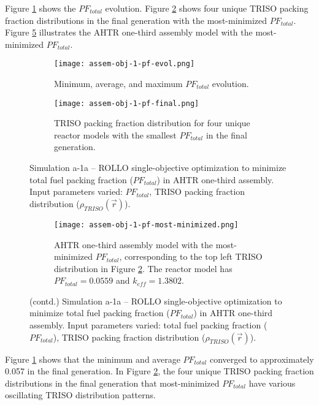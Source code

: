 Figure \ref{fig:assem-obj-1-pf-evol} shows the $PF_{total}$ evolution.
Figure \ref{fig:assem-obj-1-pf-final} shows four unique TRISO packing fraction 
distributions in the final generation with the most-minimized $PF_{total}$. 
Figure \ref{fig:assem-obj-1-pf-most-minimized} illustrates the \gls{AHTR} one-third 
assembly model with the most-minimized $PF_{total}$.
\begin{figure}[htbp!]
    \begin{subfigure}{\textwidth}
        \centering
        \texttt{[image: assem-obj-1-pf-evol.png]}
        \caption{Minimum, average, and maximum $PF_{total}$ evolution.}
        \label{fig:assem-obj-1-pf-evol} 
    \end{subfigure}
    \begin{subfigure}{\textwidth}
        \centering
        \texttt{[image: assem-obj-1-pf-final.png]}
        \caption{TRISO packing fraction distribution for four unique reactor models with the 
        smallest $PF_{total}$ in the final generation.}
        \label{fig:assem-obj-1-pf-final} 
    \end{subfigure}
    \caption{Simulation a-1a -- ROLLO single-objective optimization to minimize total 
    fuel packing fraction ($PF_{total}$) in \gls{AHTR} one-third assembly. 
    Input parameters varied: $PF_{total}$, \gls{TRISO} packing fraction 
    distribution ($\rho_{TRISO}(\vec{r})$).}
    \label{fig:assem-obj-1-pf}
\end{figure}
\begin{figure}[htbp!]
    \ContinuedFloat
    \begin{subfigure}{\textwidth}
        \centering
        \texttt{[image: assem-obj-1-pf-most-minimized.png]}
        \caption{\gls{AHTR} one-third assembly model with the most-minimized 
        $PF_{total}$, corresponding to the top left TRISO distribution in Figure 
        \ref{fig:assem-obj-1-pf-final}. The reactor model has $PF_{total}=0.0559$
        and $k_{eff}=1.3802$.}
        \label{fig:assem-obj-1-pf-most-minimized} 
    \end{subfigure}
    \caption{(contd.) Simulation a-1a -- ROLLO single-objective optimization to minimize total 
    fuel packing fraction ($PF_{total}$) in \gls{AHTR} one-third assembly. 
    Input parameters varied: total fuel packing fraction 
    ($PF_{total}$), \gls{TRISO} packing fraction distribution ($\rho_{TRISO}(\vec{r})$).}
\end{figure}
Figure \ref{fig:assem-obj-1-pf-evol} shows that the minimum and average $PF_{total}$ 
converged to approximately 0.057 in the final generation. 
In Figure \ref{fig:assem-obj-1-pf-final}, the four unique TRISO packing fraction 
distributions in the final generation that most-minimized $PF_{total}$ have various 
oscillating TRISO distribution patterns. 

